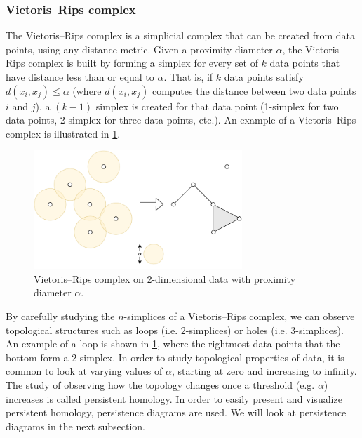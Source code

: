 \subsubsection{Vietoris–Rips complex}
\label{sec:vietoris-rips-complex}
The Vietoris–Rips complex is a simplicial complex that can be created from data points, using any distance metric. Given a proximity diameter $\alpha$, the Vietoris–Rips complex is built by forming a simplex for every set of $k$ data points that have distance less than or equal to $\alpha$. That is, if $k$ data points satisfy $d(x_i, x_j) \leq \alpha$ (where $d(x_i, x_j)$ computes the distance between two data points $i$ and $j$), a $(k-1)$ simplex is created for that data point (1-simplex for two data points, 2-simplex for three data points, etc.). An example of a Vietoris–Rips complex is illustrated in \cref{fig:simplicial-complex-rips}.
\begin{figure}[H]
    \centering
    \includegraphics[width=0.7\textwidth]{thesis/figures/simplicial-complex-rips_cropped.pdf}
    \caption{Vietoris–Rips complex on 2-dimensional data with proximity diameter $\alpha$.}
    \label{fig:simplicial-complex-rips}
\end{figure}
By carefully studying the $n$-simplices of a Vietoris–Rips complex, we can observe topological structures such as loops (i.e. $2$-simplices) or holes  (i.e. $3$-simplices). An example of a loop is shown in \cref{fig:simplicial-complex-rips}, where the rightmost data points that the bottom form a 2-simplex. In order to study topological properties of data, it is common to look at varying values of $\alpha$, starting at zero and increasing to infinity. The study of observing how the topology changes once a threshold (e.g. $\alpha$) increases is called persistent homology. In order to easily present and visualize persistent homology, persistence diagrams are used. We will look at persistence diagrams in the next subsection.

